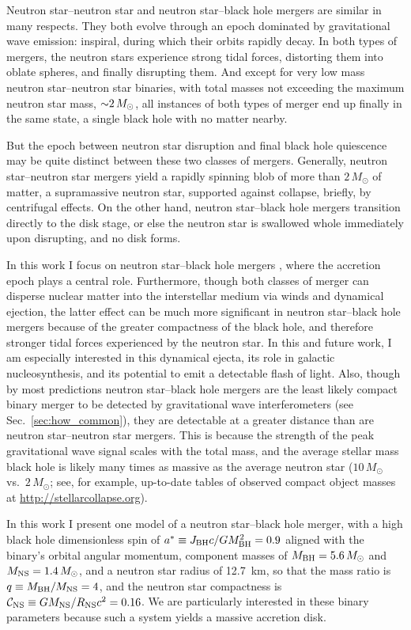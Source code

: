 Neutron star--neutron star \nsns and neutron star--black hole \nsbh mergers are
similar in many respects. They both evolve through an epoch dominated by
gravitational wave emission: inspiral, during which their orbits rapidly decay.
In both types of mergers, the neutron stars experience strong tidal forces,
distorting them into oblate spheres, and finally disrupting them.
And except for very low mass neutron star--neutron star \nsns binaries, with
total masses not exceeding the maximum neutron star mass, $\mathord{\sim}2\,M_\odot$,
all instances of both types of merger end up finally in the same state, a
single black hole with no matter nearby.

But the epoch between neutron star disruption and final black hole quiescence
may be quite distinct between these two classes of mergers. Generally, neutron
star--neutron star \nsns mergers yield a rapidly spinning blob of more than
$2\,M_\odot$ of matter, a supramassive neutron star,
supported against collapse, briefly, by centrifugal effects.
On the other hand, neutron star--black hole \nsbh mergers transition directly
to the disk stage, or else the neutron star is swallowed whole immediately upon
disrupting, and no disk forms.

In this work I focus on neutron star--black hole mergers \nsbh, where the
accretion epoch plays a central role. Furthermore, though both classes of
merger can disperse nuclear matter into the interstellar medium via winds and
dynamical ejection, the latter effect can be much more significant
in neutron star--black hole
mergers because of the greater compactness of the black hole, and therefore
stronger tidal forces experienced by the neutron star.
In this and future work, I am especially
interested in this dynamical ejecta, its role in galactic nucleosynthesis,
and its potential to emit a detectable flash of light. Also, though by most
predictions neutron star--black hole mergers are the least likely compact
binary merger to be detected by gravitational wave interferometers
(see Sec.~\ref{sec:how_common}),
they are detectable at a greater distance than are neutron star--neutron star
\nsns mergers. This is because the
strength of the peak gravitational wave signal scales with the total mass,
and the average stellar mass black hole is likely many times as massive as the
average neutron star ($10\,M_\odot$ vs.\ $2\,M_\odot$; see, for example,
up-to-date tables of observed compact object masses
at \url{http://stellarcollapse.org}).

In this work I present one model of a neutron star--black hole merger,
with a high black hole dimensionless spin of
$a^* \equiv J_{\rm BH}c/GM_{\rm BH}^2 =0.9$ aligned with the binary's orbital
angular momentum,
component masses of $M_{\rm BH}=5.6\,M_\odot$ and
$M_{\rm NS}=1.4\,M_\odot$,
and a neutron star radius of 12.7~km,
so that the mass ratio is $q \equiv M_{\rm BH}/M_{\rm NS}=4$,
and the neutron star compactness is
$\mathcal{C}_{\rm NS} \equiv G M_{\rm NS}/R_{\rm NS}c^2=0.16$.
We are particularly interested in these binary parameters because such a system
yields a massive accretion disk.

